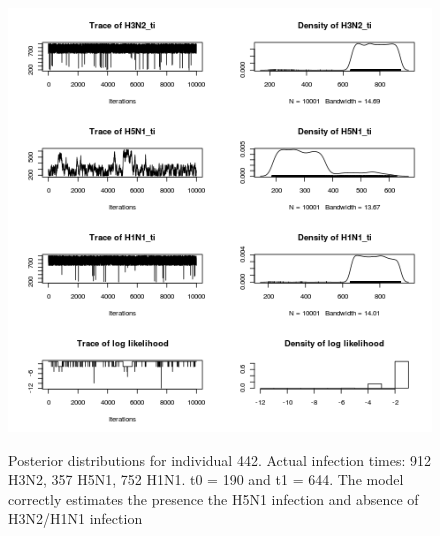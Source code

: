 \documentclass[a4paper,11pt,twoside]{article}
\begin{document}
\begin{figure}[H]
\begin{centering}
\includegraphics[scale=0.8]{442_mcmc.png}\\
\caption{Posterior distributions for individual 442. Actual infection times: 912 H3N2, 357 H5N1, 752 H1N1. t0 = 190 and t1 = 644. The model correctly estimates the presence the H5N1 infection and absence of H3N2/H1N1 infection}
\end{centering}
\end{figure}
\end{document}
